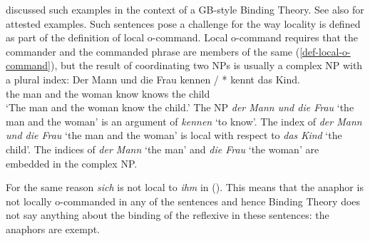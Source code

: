 \documentclass[output=paper
 	        ,biblatex
                ,babelshorthands
                ,newtxmath
                ,draftmode
                ,colorlinks, citecolor=brown
]{langscibook}
\begin{document}
\citet[]{Fanselow87a} discussed such examples in the context of a GB-style Binding
Theory. See also  for attested examples.
Such sentences pose a challenge for the way locality is defined as part of the definition of local
o-command. Local o-command requires that the commander and the commanded phrase are members of the
same \argstl (\ref{def-local-o-command}), but the result of coordinating two NPs is usually a complex NP with a plural index:
\ea
\gll Der Mann und die Frau kennen / * kennt das Kind.\\
     the man  and the woman know {} {} knows the child\\
\glt `The man and the woman know the child.'
\z
The NP \emph{der Mann und die Frau} `the man and the woman' is an argument of \emph{kennen} `to know'. The index of
\emph{der Mann und die Frau} `the man and the woman' is local with respect to \emph{das Kind} `the child'. The indices of
\emph{der Mann} `the man' and \emph{die Frau} `the woman' are embedded in the complex NP.

For the same reason \emph{sich} is not local to \emph{ihm} in (). This means that the anaphor is not locally o-commanded in any
of the sentences and hence Binding Theory does not say anything about the binding of the reflexive
in these sentences: the anaphors are exempt.
\end{document}
